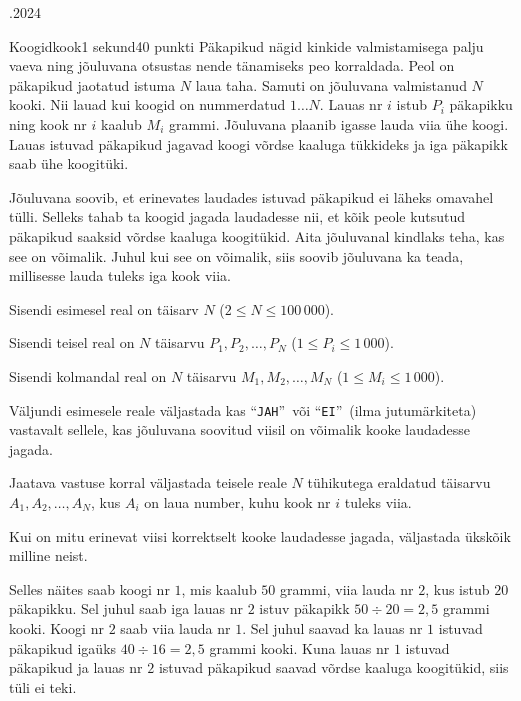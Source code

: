 \documentclass[a4paper,11pt]{article}
\begin{document}
\begin{ol}{\eio}{.2024}{\yle}{}
  \begin{yl}{4}{Koogid}{kook}{1 sekund}{40 punkti}
    Päkapikud nägid kinkide valmistamisega palju vaeva ning jõuluvana otsustas nende tänamiseks peo korraldada. Peol on päkapikud jaotatud istuma $N$ laua taha. Samuti on jõuluvana valmistanud $N$ kooki. Nii lauad kui koogid on nummerdatud $1 \ldots N$. Lauas nr $i$ istub $P_i$ päkapikku ning kook nr $i$ kaalub $M_i$ grammi. Jõuluvana plaanib igasse lauda viia ühe koogi. Lauas istuvad päkapikud jagavad koogi võrdse kaaluga tükkideks ja iga päkapikk saab ühe koogitüki.

    Jõuluvana soovib, et erinevates laudades istuvad päkapikud ei läheks omavahel tülli. Selleks tahab ta koogid jagada laudadesse nii, et kõik peole kutsutud päkapikud saaksid võrdse kaaluga koogitükid. Aita jõuluvanal kindlaks teha, kas see on võimalik. Juhul kui see on võimalik, siis soovib jõuluvana ka teada, millisesse lauda tuleks iga kook viia.

    \sis Sisendi esimesel real on täisarv $N$ ($2 \le N \le 100\,000$).

    Sisendi teisel real on $N$ täisarvu $P_1, P_2, \ldots, P_N$ ($1 \le P_i \le 1\,000$).

    Sisendi kolmandal real on $N$ täisarvu $M_1, M_2, \ldots, M_N$ ($1 \le M_i \le 1\,000$).

    \val Väljundi esimesele reale väljastada kas ``\verb/JAH/''~või ``\verb/EI/''~(ilma jutumärkiteta) vastavalt sellele, kas jõuluvana soovitud viisil on võimalik kooke laudadesse jagada.

    Jaatava vastuse korral väljastada teisele reale $N$ tühikutega eraldatud täisarvu $A_1, A_2, \ldots, A_N$, kus $A_i$ on laua number, kuhu kook nr $i$ tuleks viia.

    Kui on mitu erinevat viisi korrektselt kooke laudadesse jagada, väljastada ükskõik milline neist.

    \nde[0]{5cm}{3cm}

    Selles näites saab koogi nr $1$, mis kaalub $50$ grammi, viia lauda nr $2$, kus istub $20$ päkapikku. Sel juhul saab iga lauas nr $2$ istuv päkapikk $50 \div 20 = 2,5$ grammi kooki. Koogi nr $2$ saab viia lauda nr $1$. Sel juhul saavad ka lauas nr $1$ istuvad päkapikud igaüks $40 \div 16 = 2,5$ grammi kooki. Kuna lauas nr $1$ istuvad päkapikud ja lauas nr $2$ istuvad päkapikud saavad võrdse kaaluga koogitükid, siis tüli ei teki.

    \nde[1]{5cm}{3cm}


\end{yl}
\end{ol}
\end{document}
